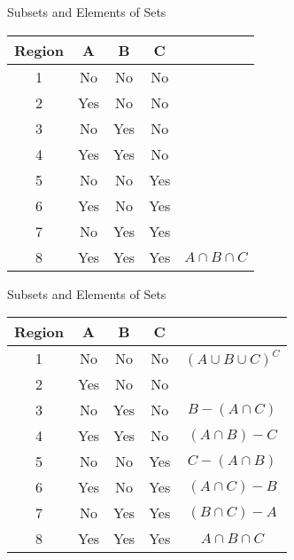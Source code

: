 
{Subsets and Elements of Sets}

\begin{center}
\begin{tabular}{|c|c|c|c|c|}
\hline Region & A & B & C &  \\ 
\hline 1 &\phantom{sp} No \phantom{sp}&\phantom{sp} No\phantom{sp} & \phantom{sp} No \phantom{sp} &  \\ 
\hline 2 & Yes & No & No &  \\ 
\hline 3 & No & Yes & No &  \\ 
\hline 4 & Yes & Yes & No &  \\ 
\hline 5 & No & No & Yes &  \\ 
\hline 6 & Yes & No & Yes &  \\ 
\hline 7 & No & Yes & Yes &  \\ 
\hline 8 & Yes & Yes & Yes & $A \cap B \cap C$ \\ 
\hline 
\end{tabular}
\end{center} 


{Subsets and Elements of Sets}

\begin{center}
\begin{tabular}{|c|c|c|c|c|}
\hline Region & A & B & C &  \\ 
\hline 1 &\phantom{s} No \phantom{s}&\phantom{s} No\phantom{s} & \phantom{s} No \phantom{s} & $(A \cup B \cup C)^C$  \\ 
\hline 2 & Yes & No & No &  \\ 
\hline 3 & No & Yes & No &  $B-(A \cap C)$\\ 
\hline 4 & Yes & Yes & No & $(A \cap B) - C$ \\ 
\hline 5 & No & No & Yes &  $C-(A \cap B)$ \\ 
\hline 6 & Yes & No & Yes & $(A \cap C) - B$ \\ 
\hline 7 & No & Yes & Yes & $(B \cap C) - A$ \\ 
\hline 8 & Yes & Yes & Yes & $A \cap B \cap C$ \\ 
\hline 
\end{tabular}
\end{center} 




